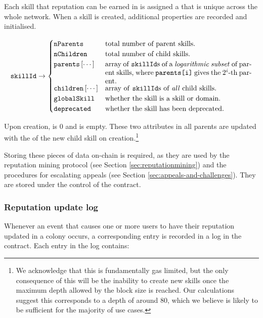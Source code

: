 Each skill that reputation can be earned in is assigned a  that is unique across the whole network. When a skill is created, additional properties are recorded and initialised.

\begin{equation*}
  \ascode{skillId} \rightarrow
  \begin{cases}
    \ascode{nParents} &	\textnormal{total number of parent skills.}\\
    \ascode{nChildren} &	\textnormal{total number of child skills.}\\
    \ascode{parents}\left[\cdots\right] &	\parbox[t]{.6\linewidth}{\textnormal{array of \ascode{skillId}s of a \textit{logarithmic subset} of parent skills, where \ascode{parents[i]} gives the $2^i$-th parent.}}\\
    \ascode{children}\left[\cdots\right] &	\textnormal{array of \ascode{skillId}s of \textit{all} child skills.}\\
    \ascode{globalSkill} &	\textnormal{whether the skill is a skill or domain.}\\
    \ascode{deprecated} &	\textnormal{whether the skill has been deprecated.}
  \end{cases}
\end{equation*}

Upon creation,  is 0 and  is empty. These two attributes in all parents are updated with the  of the new child skill on creation.\footnote{We acknowledge that this is fundamentally gas limited, but the only consequence of this will be the inability to create new skills once the maximum depth allowed by the block size is reached. Our calculations suggest this corresponds to a depth of around 80, which we believe  is likely to be sufficient for the majority of use cases.}

Storing these pieces of data on-chain is required, as they are used by the reputation mining protocol (see Section \ref{sec:reputationmining}) and the procedures for escalating appeals (see Section \ref{sec:appeals-and-challenges}). They are stored under the control of the  contract.

\subsubsection{Reputation update log}\label{subsec:reputation-update-log}

Whenever an event that causes one or more users to have their reputation updated in a colony occurs, a corresponding entry is recorded in a log in the  contract. Each entry in the log contains:

